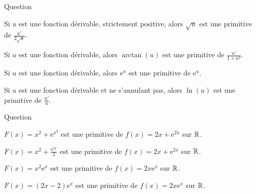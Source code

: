 

\begin{multi}[multiple,feedback=
{On a : \(\displaystyle (\sqrt{u})'=\frac{u'}{2\sqrt{u}}\), \(\displaystyle (\arctan (u))'=\frac{u'}{1+u^2}\) et \(\left(\mathrm{e}^u\right)'=u'\mathrm{e}^u\). Donc \(\displaystyle 2\sqrt{u}\) est une primitive de \(\displaystyle \frac{u'}{\sqrt{u}}\), \(\displaystyle \arctan (u)\) est une primitive de \(\displaystyle \frac{u'}{1+u^2}\) et \(\mathrm{e}^u\) n'est pas une primitive de \(\displaystyle \mathrm{e}^u\). Enfin, \(\ln (u)\) peut ne pas être définie. Il suffit de prendre \(u=-1-x^2\), par exemple.
}]{Question}
    \item* Si \(u\) est une fonction dérivable, strictement positive, alors \(\sqrt{u}\) est une primitive de \(\displaystyle \frac{u'}{2\sqrt{u}}\).
    \item* Si \(u\) est une fonction dérivable, alors \(\arctan (u)\) est une primitive de \(\displaystyle \frac{u'}{1+u^2}\).
    \item Si \(u\) est une fonction dérivable, alors \(\mathrm{e}^u\) est une primitive de \(\displaystyle \mathrm{e}^u\).
    \item Si \(u\) est une fonction dérivable et ne s'annulant pas, alors \(\ln (u)\) est une primitive de \(\displaystyle \frac{u'}{u}\).
\end{multi}


\begin{multi}[multiple,feedback=
{On calcule \(F'(x)\). Il en découle que \(\displaystyle x^2+\frac{\mathrm{e}^{2x}}{2}\) est une primitive de \(\displaystyle 2x+\mathrm{e}^{2x}\) et que \(\displaystyle (2x-2)\mathrm{e}^{x}\) est une primitive de \(\displaystyle 2x\mathrm{e}^{x}\).
}]{Question}
    \item \(\displaystyle F(x)=x^2+\mathrm{e}^{x^2}\) est une primitive de \(\displaystyle f(x)=2x+\mathrm{e}^{2x}\) sur \(\mathbb{R}\).
    \item* \(\displaystyle F(x)=x^2+\frac{\mathrm{e}^{2x}}{2}\) est une primitive de \(\displaystyle f(x)=2x+\mathrm{e}^{2x}\) sur \(\mathbb{R}\).
    \item \(\displaystyle F(x)=x^2\mathrm{e}^{x}\) est une primitive de \(\displaystyle f(x)=2x\mathrm{e}^{x}\) sur \(\mathbb{R}\).
    \item* \(\displaystyle F(x)=(2x-2)\mathrm{e}^{x}\) est une primitive de \(\displaystyle f(x)=2x\mathrm{e}^{x}\) sur \(\mathbb{R}\).
\end{multi}


